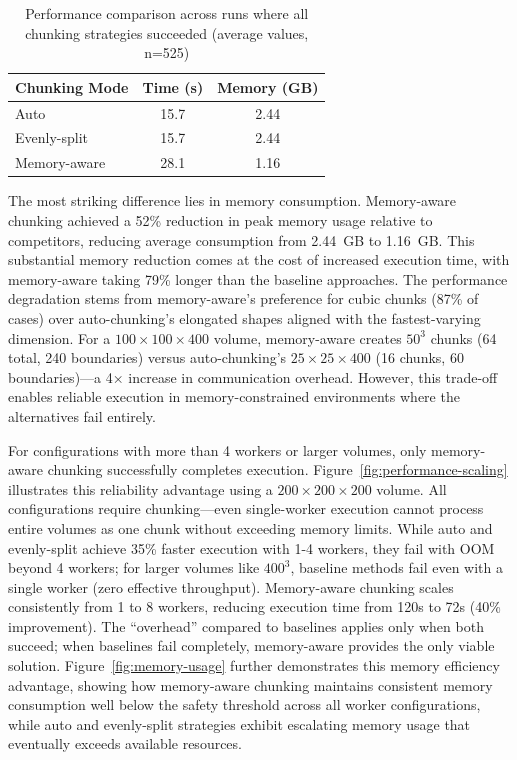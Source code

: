 \begin{table}[htb]
    \centering
    \caption{Performance comparison across runs where all chunking strategies succeeded (average values, n=525)}
    \label{tab:overall-performance}
    \begin{tabular}{lcc}
        \toprule
        \textbf{Chunking Mode} & \textbf{Time (s)} & \textbf{Memory (\ac{GB})} \\
        \midrule
        Auto & 15.7 & 2.44 \\
        Evenly-split & 15.7 & 2.44 \\
        Memory-aware & 28.1 & 1.16 \\
        \bottomrule
    \end{tabular}
\end{table}

The most striking difference lies in memory consumption.
Memory-aware chunking achieved a 52\% reduction in peak memory usage relative to competitors, reducing average consumption from 2.44~GB to 1.16~GB.
This substantial memory reduction comes at the cost of increased execution time, with memory-aware taking 79\% longer than the baseline approaches.
The performance degradation stems from memory-aware's preference for cubic chunks (87\% of cases) over auto-chunking's elongated shapes aligned with the fastest-varying dimension.
For a $100 \times 100 \times 400$ volume, memory-aware creates $50^3$ chunks (64 total, 240 boundaries) versus auto-chunking's $25 \times 25 \times 400$ (16 chunks, 60 boundaries)—a 4× increase in communication overhead.
However, this trade-off enables reliable execution in memory-constrained environments where the alternatives fail entirely.

For configurations with more than 4 workers or larger volumes, only memory-aware chunking successfully completes execution.
Figure~\ref{fig:performance-scaling} illustrates this reliability advantage using a $200\times200\times200$ volume.
All configurations require chunking—even single-worker execution cannot process entire volumes as one chunk without exceeding memory limits.
While auto and evenly-split achieve 35\% faster execution with 1-4 workers, they fail with \ac{OOM} beyond 4 workers; for larger volumes like $400^3$, baseline methods fail even with a single worker (zero effective throughput).
Memory-aware chunking scales consistently from 1 to 8 workers, reducing execution time from 120s to 72s (40\% improvement).
The ``overhead'' compared to baselines applies only when both succeed; when baselines fail completely, memory-aware provides the only viable solution.
Figure~\ref{fig:memory-usage} further demonstrates this memory efficiency advantage, showing how memory-aware chunking maintains consistent memory consumption well below the safety threshold across all worker configurations, while auto and evenly-split strategies exhibit escalating memory usage that eventually exceeds available resources.


